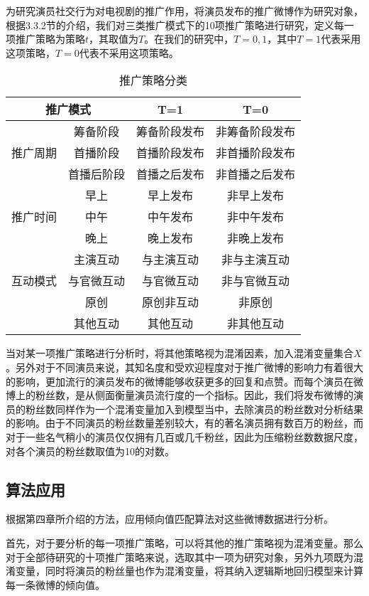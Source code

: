 为研究演员社交行为对电视剧的推广作用，将演员发布的推广微博作为研究对象，根据3.3.2节的介绍，我们对三类推广模式下的10项推广策略进行研究，定义每一项推广策略为策略$t$，其取值为$T$。在我们的研究中，$T = {0, 1}$，其中$T = 1$代表采用这项策略，$T = 0$代表不采用这项策略。

\begin{table}[!htbp]
\centering
\caption{推广策略分类}
\begin{tabular}{|c|c|c|c|} \hline
\multicolumn{2}{|c|}{推广模式}&T=1&T=0\\ \hline
\multirow{3}{*}{推广周期} & 筹备阶段&筹备阶段发布&非筹备阶段发布\\%
&首播阶段&首播阶段发布&非首播阶段发布\\%
&首播后阶段&首播之后发布&非首播之后发布\\ \hline
\multirow{3}{*}{推广时间} &早上&早上发布&非早上发布\\%
&中午&中午发布&非中午发布\\%
&晚上&晚上发布&非晚上发布\\ \hline
\multirow{3}{*}{互动模式} &主演互动&与主演互动&非与主演互动\\%
&与官微互动&与官微互动&非与官微互动\\%
&原创&原创非互动&非原创\\ 
&其他互动&其他互动&非其他互动\\ \hline
\end{tabular}
\end{table}

当对某一项推广策略进行分析时，将其他策略视为混淆因素，加入混淆变量集合$X$。另外对于不同演员来说，其知名度和受欢迎程度对于推广微博的影响力有着很大的影响，更加流行的演员发布的微博能够收获更多的回复和点赞。而每个演员在微博上的粉丝数，是从侧面衡量演员流行度的一个指标。因此，我们将发布微博的演员的粉丝数同样作为一个混淆变量加入到模型当中，去除演员的粉丝数对分析结果的影响。由于不同演员的粉丝数量差别较大，有的著名演员拥有数百万的粉丝，而对于一些名气稍小的演员仅仅拥有几百或几千粉丝，因此为压缩粉丝数数据尺度，对各个演员的粉丝数取值为10的对数。

\subsection{算法应用}

根据第四章所介绍的方法，应用倾向值匹配算法对这些微博数据进行分析。

首先，对于要分析的每一项推广策略，可以将其他的推广策略视为混淆变量。那么对于全部待研究的十项推广策略来说，选取其中一项为研究对象，另外九项既为混淆变量，同时将演员的粉丝量也作为混淆变量，将其纳入逻辑斯地回归模型来计算每一条微博的倾向值。


